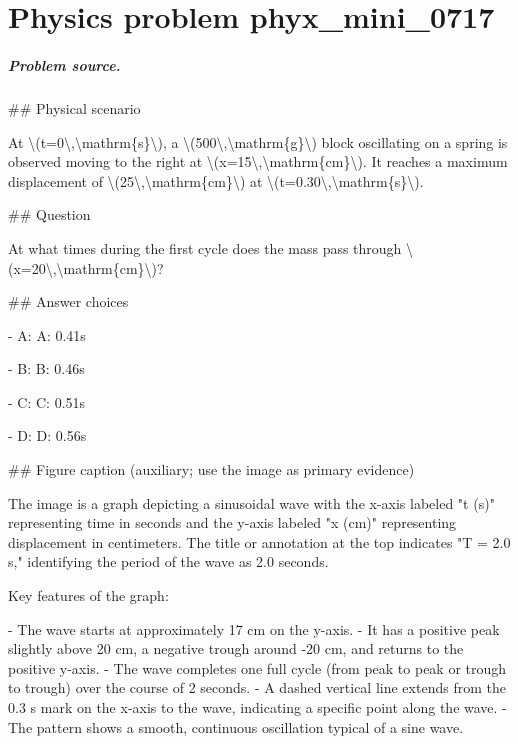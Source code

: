 
\chapter{Physics problem phyx\_mini\_0717}
\label{ch:PhyXMiniProblems_problem_phyx_mini_0717}

\paragraph{Problem source.}
\#\# Physical scenario

At \textbackslash{}(t=0\textbackslash{},\textbackslash{}mathrm\{s\}\textbackslash{}), a \textbackslash{}(500\textbackslash{},\textbackslash{}mathrm\{g\}\textbackslash{}) block oscillating on a spring is observed moving to the right at \textbackslash{}(x=15\textbackslash{},\textbackslash{}mathrm\{cm\}\textbackslash{}). It reaches a maximum displacement of \textbackslash{}(25\textbackslash{},\textbackslash{}mathrm\{cm\}\textbackslash{}) at \textbackslash{}(t=0.30\textbackslash{},\textbackslash{}mathrm\{s\}\textbackslash{}).

\#\# Question

At what times during the first cycle does the mass pass through \textbackslash{}(x=20\textbackslash{},\textbackslash{}mathrm\{cm\}\textbackslash{})?

\#\# Answer choices

- A: A: 0.41s

- B: B: 0.46s

- C: C: 0.51s

- D: D: 0.56s

\#\# Figure caption (auxiliary; use the image as primary evidence)

The image is a graph depicting a sinusoidal wave with the x-axis labeled "t (s)" representing time in seconds and the y-axis labeled "x (cm)" representing displacement in centimeters. The title or annotation at the top indicates "T = 2.0 s," identifying the period of the wave as 2.0 seconds.

Key features of the graph:

- The wave starts at approximately 17 cm on the y-axis.
- It has a positive peak slightly above 20 cm, a negative trough around -20 cm, and returns to the positive y-axis.
- The wave completes one full cycle (from peak to peak or trough to trough) over the course of 2 seconds.
- A dashed vertical line extends from the 0.3 s mark on the x-axis to the wave, indicating a specific point along the wave.
- The pattern shows a smooth, continuous oscillation typical of a sine wave.

